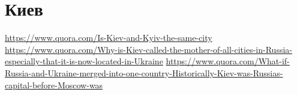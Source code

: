  
 
 
 
 
\chapter{Киев}
\label{sec:topics.kiev}

\url{https://www.quora.com/Is-Kiev-and-Kyiv-the-same-city}
\url{https://www.quora.com/Why-is-Kiev-called-the-mother-of-all-cities-in-Russia-especially-that-it-is-now-located-in-Ukraine}
\url{https://www.quora.com/What-if-Russia-and-Ukraine-merged-into-one-country-Historically-Kiev-was-Russias-capital-before-Moscow-was}




















